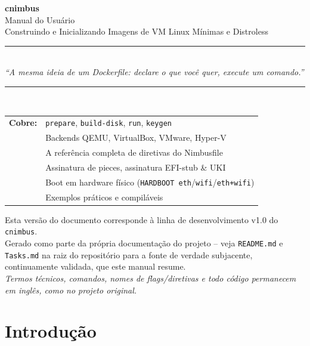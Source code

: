 \documentclass[11pt,letterpaper]{report}
\begin{document}
\begin{titlepage}
  \centering
  \vspace*{2cm}
  {\Huge\bfseries\color{cnimbusblue} cnimbus}\\[0.5cm]
  {\Large Manual do Usuário}\\[0.3cm]
  {\large Construindo e Inicializando Imagens de VM Linux Mínimas e Distroless}\\[2cm]

  \rule{0.8\textwidth}{0.4pt}\\[0.4cm]
  {\large\itshape ``A mesma ideia de um Dockerfile: declare o que você quer, execute um comando.''}\\[0.4cm]
  \rule{0.8\textwidth}{0.4pt}\\[3cm]

  \begin{tabular}{rl}
    \textbf{Cobre:} & \texttt{prepare}, \texttt{build-disk}, \texttt{run}, \texttt{keygen} \\
    & Backends QEMU, VirtualBox, VMware, Hyper-V \\
    & A referência completa de diretivas do Nimbusfile \\
    & Assinatura de pieces, assinatura EFI-stub \& UKI \\
    & Boot em hardware físico (\texttt{HARDBOOT eth}/\texttt{wifi}/\texttt{eth+wifi}) \\
    & Exemplos práticos e compiláveis \\
  \end{tabular}

  \vfill
  {\small Esta versão do documento corresponde à linha de desenvolvimento v1.0 do \texttt{cnimbus}.\\
  Gerado como parte da própria documentação do projeto --
  veja \texttt{README.md} e \texttt{Tasks.md} na raiz do repositório
  para a fonte de verdade subjacente, continuamente validada, que
  este manual resume.\\[0.3cm]
  \textit{Termos técnicos, comandos, nomes de flags/diretivas e todo
  código permanecem em inglês, como no projeto original.}}
\end{titlepage}

\tableofcontents
\clearpage

\chapter{Introdução}
\end{document}
